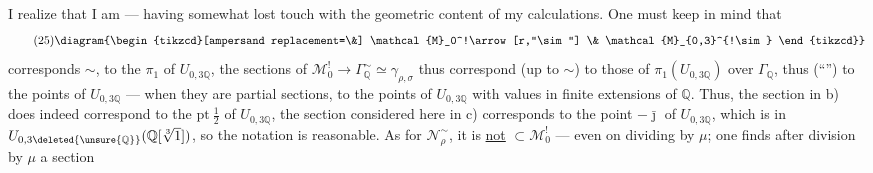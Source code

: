 I realize that I am
 --- having somewhat lost touch
with the geometric content of my
calculations. One must keep in mind that
\[
\tag{25}
\diagram{\begin{tikzcd}[ampersand replacement=\&]
\mathcal{M}_0^!\arrow[r,"\sim"] \& \mathcal{M}_{0,3}^{!\sim}
\end{tikzcd}}
\]
corresponds  $\sim$, to the \(\pi_1\) of \(U_{0,3\mathbb Q}\),
the sections of \(\mathcal{M}_0^!\longrightarrow
\Gamma_{\mathbb Q}^{\sim}\simeq\gamma_{\rho,\sigma}\) thus correspond
(up to $\sim$) to those of
\(\pi_1(U_{0,3\mathbb Q})\) over \(\Gamma_{\mathbb Q}\),
thus (``'') to the
 points of \(U_{0,3\mathbb Q}\)
--- when they are partial sections, to the
points of \(U_{0,3\mathbb Q}\) with values in finite
extensions of \(\mathbb Q\). Thus,  the section
in b) does indeed correspond to the \(\mathrm{pt}\ \frac12\) of \(U_{0,3\mathbb Q}\),
the section
 considered here in c) corresponds to the
point \(-\bar\jmath\) of \(U_{0,3\mathbb Q}\), which is in
\(U_{0,3\deleted{\unsure{\mathbb Q}}}(\mathbb Q[\sqrt[3]{1}])\),
so the notation  is reasonable.
As for \(\mathcal N_\rho^{\sim}\),
it is \uline{not} \(\subset\mathcal M_0^!\) --- even on dividing by \(\mu\);
one finds after division by \(\mu\) a section




